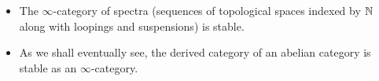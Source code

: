             \begin{example}
                
                \begin{itemize}
                    \item The $\infty$-category of spectra (sequences of topological spaces indexed by $\mathbb{N}$ along with loopings and suspensions) is stable.
                    \item As we shall eventually see, the derived category of an abelian category is stable as an $\infty$-category.
                \end{itemize}
            \end{example}
            
            \begin{definition} \label{def: triangulated_infinity_categories} 
                

\end{definition}
